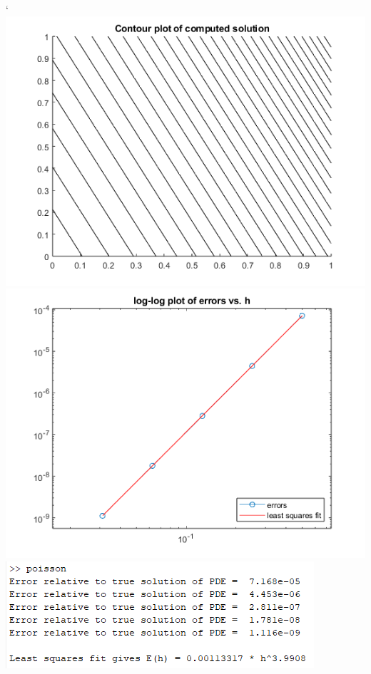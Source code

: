 \documentclass{article}
\begin{document}
\begin{center}
`   \includegraphics[scale = 0.6]{oh4table.png}
    \includegraphics[scale = 0.45]{OH4BABY.png}
    \includegraphics[scale = 0.8]{ayo.PNG}
\end{center}
\end{document}
